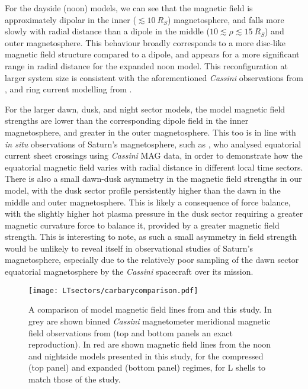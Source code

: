 For the dayside (noon) models, we can see that the magnetic field is approximately dipolar in the inner ($\lesssim\SI{10}{R_S}$) magnetosphere, and falls more slowly with radial distance than a dipole in the middle ($10\lesssim\rho\lesssim\SI{15}{R_S}$) and outer magnetosphere. This behaviour broadly corresponds to a more disc-like magnetic field structure compared to a dipole, and appears for a more significant range in radial distance for the expanded noon model. This reconfiguration at larger system size is consistent with the aforementioned \textit{Cassini} observations from \citet{arridge2008}, and ring current modelling from \citet{bunce2008}.

For the larger dawn, dusk, and night sector models, the model magnetic field strengths are lower than the corresponding dipole field in the inner magnetosphere, and greater in the outer magnetosphere. This too is in line with \textit{in situ} observations of Saturn's magnetosphere, such as \citet{delamere2015}, who analysed equatorial current sheet crossings using \textit{Cassini} MAG data, in order to demonstrate how the equatorial magnetic field varies with radial distance in different local time sectors. There is also a small dawn-dusk asymmetry in the magnetic field strengths in our model, with the dusk sector profile persistently higher than the dawn in the middle and outer magnetosphere. This is likely a consequence of force balance, with the slightly higher hot plasma pressure in the dusk sector requiring a greater magnetic curvature force to balance it, provided by a greater magnetic field strength. This is interesting to note, as such a small asymmetry in field strength would be unlikely to reveal itself in observational studies of Saturn's magnetosphere, especially due to the relatively poor sampling of the dawn sector equatorial magnetosphere by the \textit{Cassini} spacecraft over its mission.

\begin{figure}
\centering
\texttt{[image: LTsectors/carbarycomparison.pdf]}
\caption[Model magnetic field lines for the dayside and nightside models, for the compressed and expanded regimes, compared to \citet{carbary2018} results.]{A comparison of model magnetic field lines from \citet{carbary2018} and this study. In grey are shown  binned \textit{Cassini} magnetometer meridional magnetic field observations from \citet{carbary2018} (top and bottom panels an exact reproduction). In red are shown magnetic field lines from the noon and nightside models presented in this study, for the compressed (top panel) and expanded (bottom panel) regimes, for L shells to match those of the \citet{carbary2018} study.}
\label{LTsectors:fig:carbarycomparison}
\end{figure}

